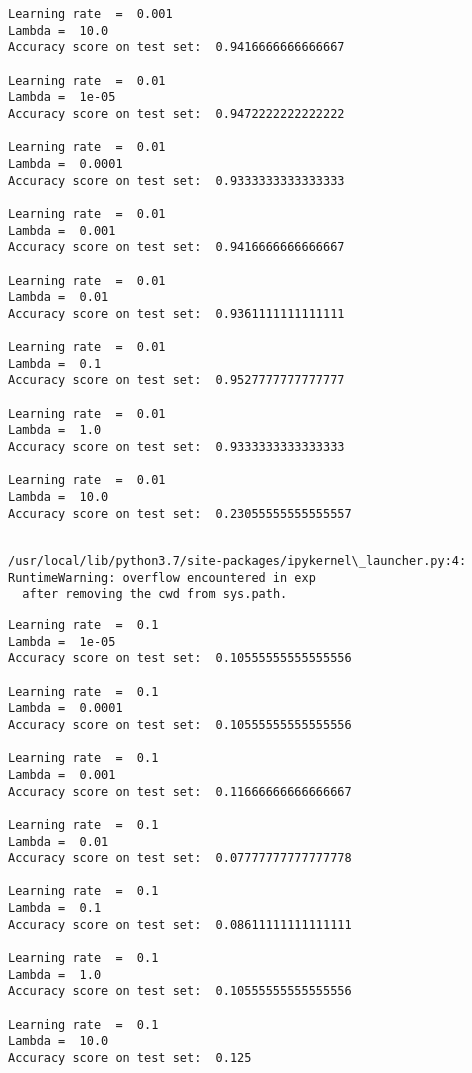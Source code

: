 \documentclass[11pt]{article}
\begin{document}
\begin{Verbatim}[commandchars=\\\{\}]
Learning rate  =  0.001
Lambda =  10.0
Accuracy score on test set:  0.9416666666666667

Learning rate  =  0.01
Lambda =  1e-05
Accuracy score on test set:  0.9472222222222222

Learning rate  =  0.01
Lambda =  0.0001
Accuracy score on test set:  0.9333333333333333

Learning rate  =  0.01
Lambda =  0.001
Accuracy score on test set:  0.9416666666666667

Learning rate  =  0.01
Lambda =  0.01
Accuracy score on test set:  0.9361111111111111

Learning rate  =  0.01
Lambda =  0.1
Accuracy score on test set:  0.9527777777777777

Learning rate  =  0.01
Lambda =  1.0
Accuracy score on test set:  0.9333333333333333

Learning rate  =  0.01
Lambda =  10.0
Accuracy score on test set:  0.23055555555555557


    \end{Verbatim}

    \begin{Verbatim}[commandchars=\\\{\}]
/usr/local/lib/python3.7/site-packages/ipykernel\_launcher.py:4: RuntimeWarning: overflow encountered in exp
  after removing the cwd from sys.path.

    \end{Verbatim}

    \begin{Verbatim}[commandchars=\\\{\}]
Learning rate  =  0.1
Lambda =  1e-05
Accuracy score on test set:  0.10555555555555556

Learning rate  =  0.1
Lambda =  0.0001
Accuracy score on test set:  0.10555555555555556

Learning rate  =  0.1
Lambda =  0.001
Accuracy score on test set:  0.11666666666666667

Learning rate  =  0.1
Lambda =  0.01
Accuracy score on test set:  0.07777777777777778

Learning rate  =  0.1
Lambda =  0.1
Accuracy score on test set:  0.08611111111111111

Learning rate  =  0.1
Lambda =  1.0
Accuracy score on test set:  0.10555555555555556

Learning rate  =  0.1
Lambda =  10.0
Accuracy score on test set:  0.125


    \end{Verbatim}
\end{document}
